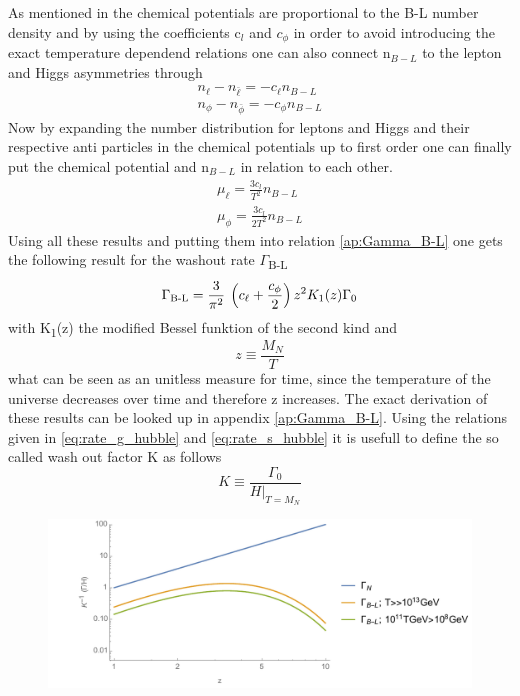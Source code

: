 As mentioned in \cite[p. 7]{Bodeker:2013qaa} the chemical potentials are proportional to the B-L number density and by using the coefficients c$_l$ and $c_\phi$ in order to avoid introducing the exact temperature dependend relations one can also connect n$_{B-L}$ to the lepton and Higgs asymmetries through \cite[p. 7]{Bodeker:2013qaa}
\begin{align}
	n_\ell-n_{\bar{\ell}}=-c_\ell n_{B-L}
	\label{eq:l-lbar} \\
	n_\phi-n_{\bar{\phi}}=-c_\phi n_{B-L}
	\label{eq:phi-phibar}
\end{align}
Now by expanding the number distribution for leptons and Higgs and their respective anti particles in the chemical potentials up to first order one can finally put the chemical potential and n$_{B-L}$ in relation to each other. 
\begin{align}
\mu_\ell=\frac{3c_l}{T^2}n_{B-L}
\label{eq:chempot_l}
\\
\mu_\phi=\frac{3c_l}{2T^2}n_{B-L}
\label{eq:chempot_phi}
\end{align}
Using all these results and putting them into relation \ref{ap:Gamma_B-L} one gets the following result for the washout rate $\Gamma$\textsubscript{B-L}
\begin{equation}
	\Gamma\textsubscript{B-L}=\frac{3}{\pi^2}\:\left(c_\ell+\frac{c_\phi}{2}\right)z^2K_1(z)\Gamma_0
	\label{eq:Gamma_B-l_result}
\end{equation}
with K\textsubscript{1}(z) the modified Bessel funktion of the second kind and 
\begin{equation}
	z\equiv\frac{M_N}{T}
\end{equation}
what can be seen as an unitless measure for time, since the temperature of the universe decreases over time and therefore z increases. 
The exact derivation of these results can be looked up in appendix \ref{ap:Gamma_B-L}. \newline
Using the relations given in \ref{eq:rate_g_hubble} and \ref{eq:rate_s_hubble} it is usefull to define the so called wash out factor K as follows
\begin{equation}
	K\equiv\frac{\Gamma_0}{\left.H\right|_{T=M_N}}
\end{equation}
\begin{figure}[H]
	\centering
	\includegraphics[width=0.7\linewidth]{Images/rates}
	\caption{}
	\label{fig:rates}
\end{figure}

